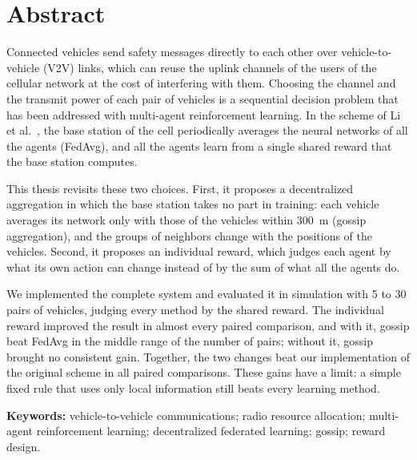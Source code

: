 
\chapter{Abstract}

Connected vehicles send safety messages directly to each other over vehicle-to-vehicle (V2V) links, which can
reuse the uplink channels of the users of the cellular network at the cost of interfering with them. Choosing
the channel and the transmit power of each pair of vehicles is a sequential decision problem that has been
addressed with multi-agent reinforcement learning. In the scheme of Li et al.~\cite{li+22fedmarl}, the base
station of the cell periodically averages the neural networks of all the agents (FedAvg), and all the agents
learn from a single shared reward that the base station computes.

This thesis revisits these two choices. First, it proposes a decentralized aggregation in which the base
station takes no part in training: each vehicle averages its network only with those of the vehicles within
\SI{300}{\meter} (gossip aggregation), and the groups of neighbors change with the positions of the
vehicles. Second, it proposes an individual reward, which judges each agent by what its own action can
change instead of by the sum of what all the agents do.

We implemented the complete system and evaluated it in simulation with 5 to 30 pairs of vehicles, judging
every method by the shared reward. The individual reward improved the result in almost every paired
comparison, and with it, gossip beat FedAvg in the middle range of the number of pairs; without it, gossip
brought no consistent gain. Together, the two changes beat our implementation of the original scheme in all
paired comparisons. These gains have a limit: a simple fixed rule that uses only local information still
beats every learning method.

\medskip
\noindent\textbf{Keywords:} vehicle-to-vehicle communications; radio resource allocation; multi-agent
reinforcement learning; decentralized federated learning; gossip; reward design.

\endinput
